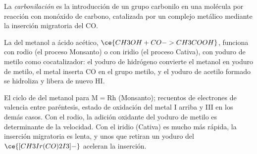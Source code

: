 \begin{definition}[Carbonilación]\label{def:b3:homogeneous-catalysis:carbonylation}
La \emph{carbonilación} es la introducción de un grupo carbonilo
en una molécula por reacción con monóxido de carbono, catalizada por un complejo metálico
mediante la inserción migratoria del CO.
\end{definition}

La  del metanol a ácido acético, $\ce{CH3OH + CO -> CH3COOH}$, funciona con
rodio (el proceso Monsanto) o con iridio (el proceso Cativa), con yoduro de metilo
como cocatalizador: el yoduro de hidrógeno convierte el metanol en yoduro de metilo, el metal
inserta CO en el grupo metilo, y el yoduro de acetilo formado se hidroliza y
libera de nuevo HI.

\begin{omfigure}

{\small El ciclo de  del metanol para $\mathrm M = \mathrm{Rh}$ (Monsanto); recuentos de electrones de
valencia entre paréntesis, estado de oxidación del metal I arriba y III en los demás casos.
Con el rodio, la adición oxidante del yoduro de metilo es determinante de la velocidad. Con el
iridio (Cativa) es mucho más rápida, la inserción migratoria es lenta, y unos
 que retiran un yoduro del $\ce{[CH3Ir(CO)2I3]-}$ aceleran la inserción.}
\end{omfigure}

